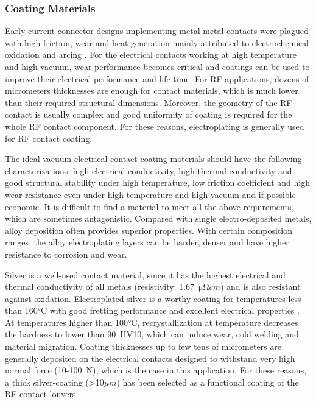 {\subsubsection{Coating Materials}
Early current connector designs implementing metal-metal contacts were plagued with high friction, wear and heat generation mainly attributed to electrochemical oxidation and arcing . For the electrical contacts working at high temperature and high vacuum, wear performance becomes critical and coatings can be used to improve their electrical performance and life-time. For RF applications, dozens of micrometers thicknesses are enough for contact materials, which is much lower than their required structural dimensions. Moreover, the geometry of the RF contact is usually complex and good uniformity of coating is required for the whole RF contact component. For these reasons, electroplating is generally used for RF contact coating.  

The ideal vacuum electrical contact coating materials should have the following characterizations: high electrical conductivity, high thermal conductivity and good structural stability under high temperature, low friction coefficient and high wear resistance even under high temperature and high vacuum and if possible economic. It is difficult to find a material to meet all the above requirements, which are sometimes antagonistic. Compared with single electro-deposited metals, alloy deposition often provides superior properties. With certain composition ranges, the alloy electroplating layers can be harder, denser and have higher resistance to corrosion and wear. 

Silver is a well-used contact material, since it has the highest electrical and thermal conductivity of all metals (resistivity: 1.67~$\si{\micro \ohm cm}$) and is also resistant against oxidation. Electroplated silver is a worthy coating for temperatures less than 160$\si{\degreeCelsius}$ with good fretting performance and excellent electrical properties . At temperatures higher than 100$\si{\degreeCelsius}$, recrystallization at temperature decreases the hardness to lower than 90~HV10, which can induce wear, cold welding and material migration. Coating thicknesses up to few tens of micrometers are generally deposited on the electrical contacts designed to withstand very high normal force (10-100~N), which is the case in this application. For these reasons, a thick silver-coating (>10$\si{\mu m}$) has been selected as a functional coating of the RF contact louvers.

}
